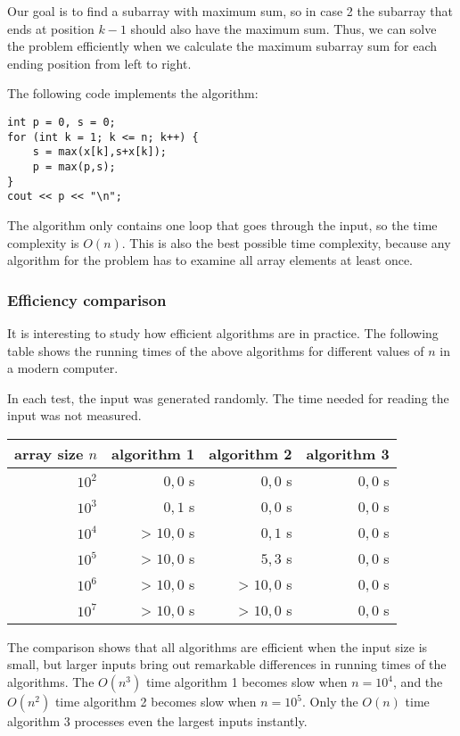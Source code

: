 Our goal is to find a subarray with maximum sum,
so in case 2 the subarray that ends at position $k-1$
should also have the maximum sum.
Thus, we can solve the problem efficiently
when we calculate the maximum subarray sum
for each ending position from left to right.

The following code implements the algorithm:
\begin{lstlisting}
int p = 0, s = 0;
for (int k = 1; k <= n; k++) {
    s = max(x[k],s+x[k]);
    p = max(p,s);
}
cout << p << "\n";
\end{lstlisting}

The algorithm only contains one loop
that goes through the input,
so the time complexity is $O(n)$.
This is also the best possible time complexity,
because any algorithm for the problem
has to examine all array elements at least once.

\subsubsection{Efficiency comparison}

It is interesting to study how efficient 
algorithms are in practice.
The following table shows the running times
of the above algorithms for different
values of $n$ in a modern computer.

In each test, the input was generated randomly.
The time needed for reading the input was not
measured.

\begin{center}
\begin{tabular}{rrrr}
array size $n$ & algorithm 1 & algorithm 2 & algorithm 3 \\
\hline
$10^2$ & $0{,}0$ s & $0{,}0$ s & $0{,}0$ s \\
$10^3$ & $0{,}1$ s & $0{,}0$ s & $0{,}0$ s \\
$10^4$ & > $10,0$ s & $0{,}1$ s & $0{,}0$ s \\
$10^5$ & > $10,0$ s & $5{,}3$ s & $0{,}0$ s \\
$10^6$ & > $10,0$ s & > $10,0$ s & $0{,}0$ s \\
$10^7$ & > $10,0$ s & > $10,0$ s & $0{,}0$ s \\
\end{tabular}
\end{center}

The comparison shows that all algorithms
are efficient when the input size is small,
but larger inputs bring out remarkable
differences in running times of the algorithms.
The $O(n^3)$ time algorithm 1 becomes slow
when $n=10^4$, and the $O(n^2)$ time algorithm 2
becomes slow when $n=10^5$.
Only the $O(n)$ time algorithm 3 processes
even the largest inputs instantly.
